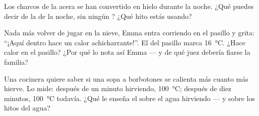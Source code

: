 \begin{exercise}[$\star$]\label{exo:g3:temperature-thermometers:9}
Los charcos de la acera se han convertido en hielo durante la noche.
¿Qué puedes decir de la  de la noche, sin ningún
? ¿Qué hito estás usando?
\end{exercise}

\begin{exercise}[$\star\star$]\label{exo:g3:temperature-thermometers:10}
Nada más volver de jugar en la nieve, Emma entra corriendo en el
pasillo y grita: ``¡Aquí dentro hace un calor achicharrante!''. El
 del pasillo marca \qty{16}{\celsius}. ¿Hace calor en el
pasillo? ¿Por qué lo nota así Emma --- y de qué juez debería fiarse la
familia?
\end{exercise}

\begin{exercise}[$\star\star$]\label{exo:g3:temperature-thermometers:11}
Una cocinera quiere saber si una sopa a borbotones se calienta más
cuanto más hierve. Lo mide: después de un minuto hirviendo,
\qty{100}{\celsius}; después de diez minutos, \qty{100}{\celsius}
todavía. ¿Qué le enseña el  sobre el agua hirviendo --- y
sobre los hitos del agua?
\end{exercise}

